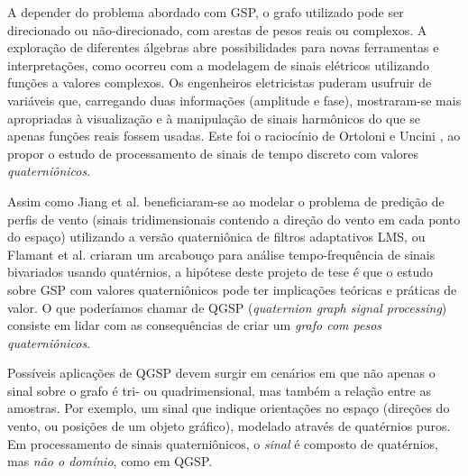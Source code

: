 A depender do problema abordado com GSP, o grafo utilizado pode ser direcionado ou n\~ao-direcionado, com arestas de pesos reais ou complexos. A explora\c c\~ao de diferentes \'algebras abre possibilidades para novas ferramentas e interpreta\c c\~oes, como ocorreu com a modelagem de sinais el\'etricos utilizando fun\c c\~oes a valores complexos. Os engenheiros eletricistas puderam usufruir de vari\'aveis que, carregando duas informa\c c\~oes (amplitude e fase), mostraram-se mais apropriadas \`a visualiza\c c\~ao e \`a manipula\c c\~ao de sinais harm\^onicos do que se apenas fun\c c\~oes reais fossem usadas. Este foi o racioc\'inio de Ortoloni e Uncini \cite{ortolani2016quaternion}, ao propor o estudo de processamento de sinais de tempo discreto com valores \emph{quaterni\^onicos}.


Assim como Jiang et al. \cite{jiang2013frequency} beneficiaram-se ao modelar o problema de predi\c c\~ao de perfis de vento (sinais tridimensionais contendo a dire\c c\~ao do vento em cada ponto do espa\c co) utilizando a vers\~ao quaterni\^onica de filtros adaptativos LMS, ou Flamant et al. \cite{flamant2018complete} criaram um arcabou\c co para an\'alise tempo-frequ\^encia de sinais bivariados usando quat\'ernios, a hip\'otese deste projeto de tese \'e que o estudo sobre GSP com valores quaterni\^onicos pode ter implica\c c\~oes te\'oricas e pr\'aticas de valor. O que poder\'iamos chamar de QGSP (\emph{quaternion graph signal processing}) consiste em lidar com as consequ\^encias de criar um \emph{grafo com pesos quaterni\^onicos}.

Poss\'iveis aplica\c c\~oes de QGSP devem surgir em cen\'arios em que n\~ao apenas o sinal sobre o grafo \'e tri- ou quadrimensional, mas tamb\'em a rela\c c\~ao entre as amostras. Por exemplo, um sinal que indique orienta\c c\~oes no espa\c co (dire\c c\~oes do vento, ou posi\c c\~oes de um objeto gr\'afico), modelado atrav\'es de quat\'ernios puros. Em processamento de sinais quaterni\^onicos, o \emph{sinal} \'e composto de quat\'ernios, mas \emph{n\~ao o dom\'inio}, como em QGSP.



